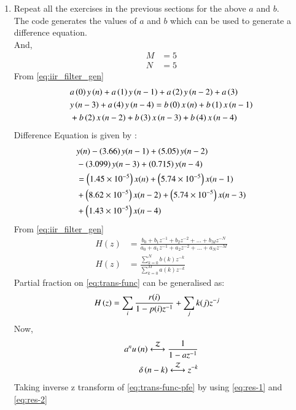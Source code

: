 \documentclass[journal,12pt,twocolumn]{IEEEtran}
\theoremstyle{remark}
\renewcommand\thesection{\arabic{section}}
\begin{document}
\begin{enumerate}[label=\thesection.\arabic*]
\item Repeat all the exercises in the previous sections for the above $a$ and $b$.\\
\solution The code generates the values of $a$ and $b$  which can be used to generate a difference equation.\\
And,
\begin{align}
    M &= 5\\
    N&=5
\end{align}
From \ref{eq:iir_filter_gen} 
\begin{align}
    &a\left(0\right)y\left(n\right) + a\left(1\right)y\left(n-1\right)+a\left(2\right)y\left(n-2\right)+a\left(3\right)\\ \notag &y\left(n-3\right) + a\left(4\right)y\left(n-4\right) =   b\left(0\right)x\left(n\right) + b\left(1\right)x\left(n-1\right)\\ \notag &+b\left(2\right)x\left(n-2\right)+b\left(3\right)x\left(n-3\right) + b\left(4\right)x\left(n-4\right) 
\end{align}
Difference Equation is given by :
\begin{align}
	&y(n) - \left(3.66\right)y(n - 1) + \left(5.05\right)y(n - 2) \nonumber \\
	&- \left(3.099\right)y(n - 3) + \left(0.715\right)y(n - 4) \nonumber \\
	&= \left(1.45\times 10^{-5}\right)x(n) + \left(5.74 \times 10^{-5}\right)x(n - 1) \nonumber \\
	&+ \left(8.62 \times 10^{-5}\right)x(n - 2) + \left(5.74 \times 10^{-5}\right)x(n - 3) \nonumber \\
	&+ \left(1.43 \times 10^{-5}\right)x(n - 4)
\end{align}
From \eqref{eq:iir_filter_gen} 
\begin{align}
    H(z) &= \frac{b_0 + b_1 z^{-1} + b_2 z^{-2} + \ldots + b_M z^{-N}}{a_0 + a_1 z^{-1} + a_2 z^{-2} + \ldots + a_N z^{-M}}\\
    H(z) &= \frac{\sum_{k = 0}^{N}b(k)z^{-k}}{\sum_{k = 0}^{M}a(k)z^{-k}} \label{eq:trans-func}
\end{align}
Partial fraction on \eqref{eq:trans-func} can be generalised as:
\begin{align}
    H\left(z\right)&= \sum_{i}\frac{r(i)}{1 - p(i)z^{-1}} + \sum_{j}k(j)z^{-j}
	\label{eq:trans-func-pfe}
\end{align}
Now,
\begin{align}
    a^{n}u\brak{n} \system{Z} \frac{1}{1-az^{-1}} \label{eq:res-1}\\
    \delta\brak{n-k} \system{Z} z^{-k}\label{eq:res-2}
\end{align}
Taking inverse z transform of \eqref{eq:trans-func-pfe} by using \eqref{eq:res-1} and \eqref{eq:res-2}

\end{enumerate}
\end{document}
